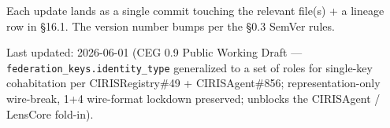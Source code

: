 \documentclass[10pt]{article}
\begin{document}
Each update lands as a single commit touching the relevant file(s) + a lineage row in §16.1. The version number bumps per the §0.3 SemVer rules.


Last updated: 2026-06-01 (CEG 0.9 Public Working Draft — \texttt{federation\_keys.identity\_type} generalized to a set of roles for single-key cohabitation per CIRISRegistry\#49 + CIRISAgent\#856; representation-only wire-break, 1+4 wire-format lockdown preserved; unblocks the CIRISAgent / LensCore fold-in).




\clearpage
\end{document}

